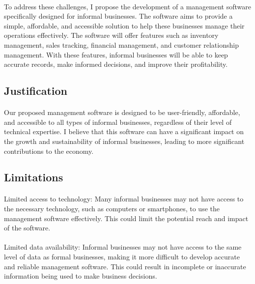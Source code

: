 \documentclass{article}
\begin{document}
\paragraph*{}
To address these challenges, I propose the development of a management software specifically designed for informal businesses. The software aims to provide a simple, affordable, and accessible solution to help these businesses manage their operations effectively. The software will offer features such as inventory management, sales tracking, financial management, and customer relationship management. With these features, informal businesses will be able to keep accurate records, make informed decisions, and improve their profitability.

\subsection{Justification}
\paragraph*{}
Our proposed management software is designed to be user-friendly, affordable, and accessible to all types of informal businesses, regardless of their level of technical expertise. I believe that this software can have a significant impact on the growth and sustainability of informal businesses, leading to more significant contributions to the economy.

\subsection{Limitations}
\paragraph*{}
Limited access to technology: Many informal businesses may not have access to the necessary technology, such as computers or smartphones, to use the management software effectively. This could limit the potential reach and impact of the software.

\paragraph*{}
Limited data availability: Informal businesses may not have access to the same level of data as formal businesses, making it more difficult to develop accurate and reliable management software. This could result in incomplete or inaccurate information being used to make business decisions.
\end{document}
